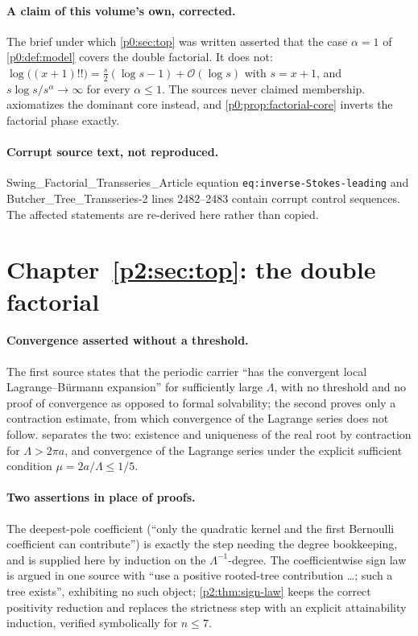 \documentclass[11pt,a4paper,oneside]{book}
\theoremstyle{plain}
\theoremstyle{definition}
\theoremstyle{remark}
\newcommand{\bigO}{\mathcal{O}}
\begin{document}
\paragraph{A claim of this volume's own, corrected.}
The brief under which \cref{p0:sec:top} was written asserted that the case
\(\alpha=1\) of \cref{p0:def:model} covers the double factorial.  It does not:
\(\log\bigl((x+1)!!\bigr)=\tfrac{s}{2}(\log s-1)+\bigO(\log s)\) with
\(s=x+1\), and \(s\log s/s^{\alpha}\to\infty\) for every \(\alpha\le1\).  The
sources never claimed membership.   axiomatizes the
dominant core instead, and \cref{p0:prop:factorial-core} inverts the factorial
phase exactly.

\paragraph{Corrupt source text, not reproduced.}
\textsf{Swing\_\allowbreak Factorial\_\allowbreak Transseries\_\allowbreak Article} equation
\texttt{eq:inverse-\allowbreak Stokes-\allowbreak leading} and
\textsf{Butcher\_\allowbreak Tree\_\allowbreak Transseries-2} lines 2482--2483 contain corrupt control
sequences.  The affected statements are re-derived here rather than copied.

\section{Chapter~\ref{p2:sec:top}: the double factorial}

\paragraph{Convergence asserted without a threshold.}
The first source states that the periodic carrier ``has the convergent local
Lagrange--Bürmann expansion'' for sufficiently large \(\Lambda\), with no
threshold and no proof of convergence as opposed to formal solvability; the
second proves only a contraction estimate, from which convergence of the
Lagrange series does not follow.   separates the two:
existence and uniqueness of the real root by contraction for
\(\Lambda>2\pi a\), and convergence of the Lagrange series under the explicit
sufficient condition \(\mu=2a/\Lambda\le1/5\).

\paragraph{Two assertions in place of proofs.}
The deepest-pole coefficient (``only the quadratic kernel and the first
Bernoulli coefficient can contribute'') is exactly the step needing the degree
bookkeeping, and is supplied here by induction on the
\(\Lambda^{-1}\)-degree.  The coefficientwise sign law is argued in one source
with ``use a positive rooted-tree contribution \dots; such a tree exists'',
exhibiting no such object; \cref{p2:thm:sign-law} keeps the correct positivity
reduction and replaces the strictness step with an explicit attainability
induction, verified symbolically for \(n\le7\).
\end{document}

